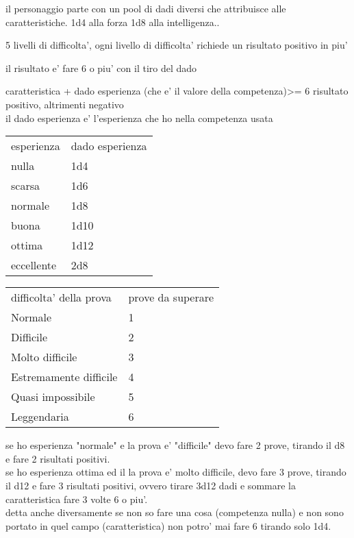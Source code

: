 \documentclass[12pt,a4paper]{book}
\begin{document}
il personaggio parte con un pool di dadi diversi che attribuisce alle caratteristiche.
1d4 alla forza
1d8 alla intelligenza..

5 livelli di difficolta', ogni livello di difficolta' richiede un risultato positivo in piu'

il risultato e' fare 6 o piu' con il tiro del dado

caratteristica  + dado esperienza (che e' il valore della competenza)>= 6 risultato positivo, altrimenti negativo\\
il dado esperienza e' l'esperienza che ho nella competenza usata\\

\medskip

\begin{tabular}{ll}
	\hline
esperienza & dado esperienza\\
nulla		&	1d4	\\
scarsa		&	1d6	\\
normale		&   1d8	\\
buona		&	1d10\\
ottima		&	1d12\\
eccellente	&	2d8\\
\end{tabular}

\medskip

\begin{tabular}{ll}
	\hline
difficolta' della prova & prove da superare\\
	Normale          			& 1\\
	Difficile        			& 2\\
	Molto difficile 	 		& 3\\
	Estremamente difficile      & 4\\
	Quasi impossibile			& 5\\
	Leggendaria      			& 6\\
\end{tabular}

\medskip

se ho esperienza "normale" e la prova e' "difficile" devo fare 2 prove, tirando il d8 e fare 2 risultati positivi.\\
se ho esperienza ottima ed il la prova e' molto difficile, devo fare 3 prove, tirando il d12 e fare 3 risultati positivi, ovvero tirare 3d12 dadi e sommare la caratteristica  fare 3 volte 6 o piu'.\\

detta anche diversamente se non so fare una cosa (competenza nulla) e non sono portato in quel campo (caratteristica) non potro' mai fare 6 tirando solo 1d4.
\end{document}

